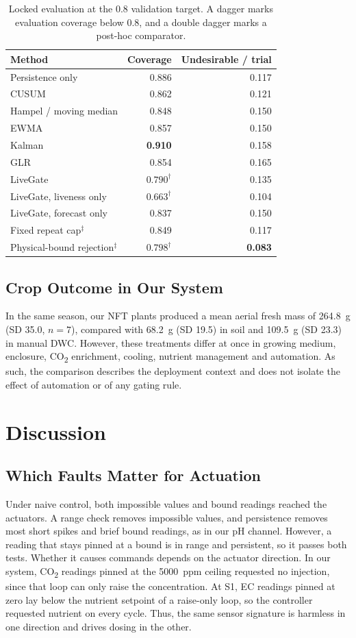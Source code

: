 \documentclass[preprint,12pt,doubleblind]{elsarticle}
\newcommand{\best}[1]{\textbf{#1}}
\newcommand{\COtwo}{CO\textsubscript{2}}
\begin{document}
\begin{table}[!htbp]
\centering
\caption{Locked evaluation at the 0.8 validation target. A dagger marks evaluation coverage below 0.8, and a double dagger marks a post-hoc comparator.}
\label{tab:benchmark}
\small
\begin{tabular}{lrr}
\toprule
Method & Coverage & Undesirable / trial \\
\midrule
Persistence only & 0.886 & 0.117 \\
CUSUM & 0.862 & 0.121 \\
Hampel / moving median & 0.848 & 0.150 \\
EWMA & 0.857 & 0.150 \\
Kalman & \best{0.910} & 0.158 \\
GLR & 0.854 & 0.165 \\
LiveGate & $0.790^{\dagger}$ & 0.135 \\
LiveGate, liveness only & $0.663^{\dagger}$ & 0.104 \\
LiveGate, forecast only & 0.837 & 0.150 \\
Fixed repeat cap$^{\ddagger}$ & 0.849 & 0.117 \\
Physical-bound rejection$^{\ddagger}$ & $0.798^{\dagger}$ & \best{0.083} \\
\bottomrule
\end{tabular}
\end{table}

\subsection{Crop Outcome in Our System}
In the same season, our NFT plants produced a mean aerial fresh mass of 264.8~g (SD 35.0, $n=7$), compared with 68.2~g (SD 19.5) in soil and 109.5~g (SD 23.3) in manual DWC. However, these treatments differ at once in growing medium, enclosure, \COtwo{} enrichment, cooling, nutrient management and automation. As such, the comparison describes the deployment context and does not isolate the effect of automation or of any gating rule.
\FloatBarrier

\section{Discussion}
\label{sec:discussion}
\subsection{Which Faults Matter for Actuation}
Under naive control, both impossible values and bound readings reached the actuators. A range check removes impossible values, and persistence removes most short spikes and brief bound readings, as in our pH channel. However, a reading that stays pinned at a bound is in range and persistent, so it passes both tests. Whether it causes commands depends on the actuator direction. In our system, \COtwo{} readings pinned at the 5000~ppm ceiling requested no injection, since that loop can only raise the concentration. At S1, EC readings pinned at zero lay below the nutrient setpoint of a raise-only loop, so the controller requested nutrient on every cycle. Thus, the same sensor signature is harmless in one direction and drives dosing in the other.
\end{document}
